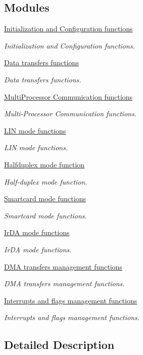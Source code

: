 \subsection*{Modules}
\begin{DoxyCompactItemize}
\item 
\hyperlink{group___u_s_a_r_t___group1}{Initialization and Configuration functions}
\begin{DoxyCompactList}\small\item\em Initialization and Configuration functions. \end{DoxyCompactList}\item 
\hyperlink{group___u_s_a_r_t___group2}{Data transfers functions}
\begin{DoxyCompactList}\small\item\em Data transfers functions. \end{DoxyCompactList}\item 
\hyperlink{group___u_s_a_r_t___group3}{Multi\+Processor Communication functions}
\begin{DoxyCompactList}\small\item\em Multi-\/\+Processor Communication functions. \end{DoxyCompactList}\item 
\hyperlink{group___u_s_a_r_t___group4}{L\+I\+N mode functions}
\begin{DoxyCompactList}\small\item\em L\+IN mode functions. \end{DoxyCompactList}\item 
\hyperlink{group___u_s_a_r_t___group5}{Halfduplex mode function}
\begin{DoxyCompactList}\small\item\em Half-\/duplex mode function. \end{DoxyCompactList}\item 
\hyperlink{group___u_s_a_r_t___group6}{Smartcard mode functions}
\begin{DoxyCompactList}\small\item\em Smartcard mode functions. \end{DoxyCompactList}\item 
\hyperlink{group___u_s_a_r_t___group7}{Ir\+D\+A mode functions}
\begin{DoxyCompactList}\small\item\em Ir\+DA mode functions. \end{DoxyCompactList}\item 
\hyperlink{group___u_s_a_r_t___group8}{D\+M\+A transfers management functions}
\begin{DoxyCompactList}\small\item\em D\+MA transfers management functions. \end{DoxyCompactList}\item 
\hyperlink{group___u_s_a_r_t___group9}{Interrupts and flags management functions}
\begin{DoxyCompactList}\small\item\em Interrupts and flags management functions. \end{DoxyCompactList}\end{DoxyCompactItemize}


\subsection{Detailed Description}
